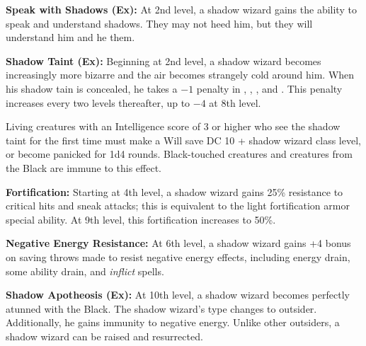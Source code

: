 {\textbf{Speak with Shadows (Ex):} At 2nd level, a shadow wizard gains the ability to speak and understand shadows. They may not heed him, but they will understand him and he them.

\textbf{Shadow Taint (Ex):} Beginning at 2nd level, a shadow wizard becomes increasingly more bizarre and the air becomes strangely cold around him. When his shadow tain is concealed, he takes a $-1$ penalty in , , , and . This penalty increases every two levels thereafter, up to $-4$ at 8th level.

Living creatures with an Intelligence score of 3 or higher who see the shadow taint for the first time must make a Will save DC 10 + shadow wizard class level, or become panicked for 1d4 rounds. Black-touched creatures and creatures from the Black are immune to this effect.

\textbf{Fortification:} Starting at 4th level, a shadow wizard gains 25\% resistance to critical hits and sneak attacks; this is equivalent to the light fortification armor special ability. At 9th level, this fortification increases to 50\%.

\textbf{Negative Energy Resistance:} At 6th level, a shadow wizard gains +4 bonus on saving throws made to resist negative energy effects, including energy drain, some ability drain, and \emph{inflict} spells.

\textbf{Shadow Apotheosis (Ex):} At 10th level, a shadow wizard becomes perfectly atunned with the Black. The shadow wizard's type changes to outsider. Additionally, he gains immunity to negative energy. Unlike other outsiders, a shadow wizard can be raised and resurrected.

}